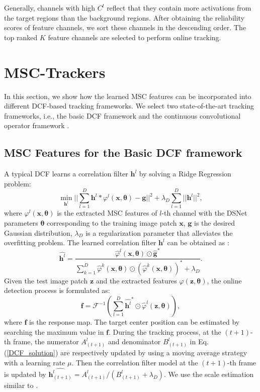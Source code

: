 \documentclass[runningheads]{llncs}
\begin{document}
Generally, channels with high $C^l$ reflect that they contain more activations from the target regions than the background regions. After obtaining the reliability scores of feature channels, we sort these channels in the descending order. The top ranked $K$ feature channels are selected to perform online tracking. 




\section{MSC-Trackers}
In this section, we show how the learned MSC features can be incorporated into different DCF-based tracking frameworks. We select two state-of-the-art tracking frameworks, i.e., the basic DCF framework \cite{KCF} and the continuous convolutional operator framework \cite{CCOT}.   
\subsection{MSC Features for the Basic DCF framework} 
A typical DCF learns a correlation filter $\mathbf{h}^{l}$ by solving a Ridge Regression problem:
\begin{equation}\label{DCF_loss}
 \min_{\mathbf{h}^{l}}  ||\sum_{l=1}^{D} {\mathbf{h}^{l}} \ast \varphi^{l}(\mathbf{x}, \mathbf{\theta})-\mathbf{g}||^{2} + \lambda_{D}\sum_{l=1}^{D}||\mathbf{h}^{l}||^{2},
\end{equation}
where $\varphi^{l}(\mathbf{x}, \mathbf{\theta})$ is the extracted MSC features of $l$-th channel with the DSNet parameters $\mathbf{\theta}$ corresponding to the training image patch $\mathbf{x}$, $\mathbf{g}$ is the desired Gaussian distribution, $\lambda_{D}$ is a regularization parameter that alleviates the overfitting problem. The learned correlation filter $\mathbf{h}^{l}$ can be obtained as \cite{KCF}:
\begin{equation}\label{DCF_solution}
\hat{\mathbf{h}^{l}} = \frac{\hat{\varphi}^{l}(\mathbf{x}, \mathbf{\theta}) \odot \hat{\mathbf{g}}^{\ast}}{\sum_{k=1}^{D}{\hat{\varphi}^{k}(\mathbf{x}, \mathbf{\theta}) \odot (\hat{\varphi}^{k}(\mathbf{x}, \mathbf{\theta}))^{\ast}+\lambda_D}}.
\end{equation}
Given the test image patch $\mathbf{z}$ and the extracted features $\varphi(\mathbf{z}, \mathbf{\theta})$, the online detection process is formulated as:
\begin{equation}\label{Detection}
\mathbf{f} = \mathcal{F}^{-1}(\sum_{l=1}^{D}\hat{\mathbf{h}^{l}}^{\ast} \odot \hat{\varphi}^{l}(\mathbf{z, \mathbf{\theta}})),
\end{equation}
where $\mathbf{f}$ is the response map. The target center position can be estimated by searching the maximum value in $\mathbf{f}$. During the tracking process, at the $(t+1)$-th frame, the numerator $A_{(t+1)}^{l}$ and denominator $B_{(t+1)}^{l}$ in Eq. (\ref{DCF_solution}) are respectively updated by using a moving average strategy with a learning rate $\mu$. Then the correlation filter model at the $(t+1)$-th frame is updated by $\hat{\mathbf{h}^{l}_{(t+1)}} = A_{(t+1)}^{l} / (B_{(t+1)}^{l}+\lambda_{D})$. We use the scale estimation similar to \cite{DCFNet}.
\end{document}
